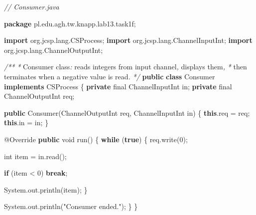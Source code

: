 \documentclass[11pt]{article}
\newenvironment{Shaded}{}{}
\newcommand{\KeywordTok}[1]{\textcolor[rgb]{0.00,0.44,0.13}{\textbf{{#1}}}}
\newcommand{\DataTypeTok}[1]{\textcolor[rgb]{0.56,0.13,0.00}{{#1}}}
\newcommand{\DecValTok}[1]{\textcolor[rgb]{0.25,0.63,0.44}{{#1}}}
\newcommand{\StringTok}[1]{\textcolor[rgb]{0.25,0.44,0.63}{{#1}}}
\newcommand{\CommentTok}[1]{\textcolor[rgb]{0.38,0.63,0.69}{\textit{{#1}}}}
\newcommand{\FunctionTok}[1]{\textcolor[rgb]{0.02,0.16,0.49}{{#1}}}
\newcommand{\NormalTok}[1]{{#1}}
\newcommand{\ImportTok}[1]{{#1}}
\newcommand{\ControlFlowTok}[1]{\textcolor[rgb]{0.00,0.44,0.13}{\textbf{{#1}}}}
\newcommand{\OperatorTok}[1]{\textcolor[rgb]{0.40,0.40,0.40}{{#1}}}
\newcommand{\BuiltInTok}[1]{{#1}}
\newcommand{\AttributeTok}[1]{\textcolor[rgb]{0.49,0.56,0.16}{{#1}}}
\begin{document}
    \begin{Shaded}
\begin{Highlighting}[]
\CommentTok{// Consumer.java}

\KeywordTok{package}\ImportTok{ pl}\OperatorTok{.}\ImportTok{edu}\OperatorTok{.}\ImportTok{agh}\OperatorTok{.}\ImportTok{tw}\OperatorTok{.}\ImportTok{knapp}\OperatorTok{.}\ImportTok{lab13}\OperatorTok{.}\ImportTok{task1f}\OperatorTok{;}

\KeywordTok{import} \ImportTok{org}\OperatorTok{.}\ImportTok{jcsp}\OperatorTok{.}\ImportTok{lang}\OperatorTok{.}\ImportTok{CSProcess}\OperatorTok{;}
\KeywordTok{import} \ImportTok{org}\OperatorTok{.}\ImportTok{jcsp}\OperatorTok{.}\ImportTok{lang}\OperatorTok{.}\ImportTok{ChannelInputInt}\OperatorTok{;}
\KeywordTok{import} \ImportTok{org}\OperatorTok{.}\ImportTok{jcsp}\OperatorTok{.}\ImportTok{lang}\OperatorTok{.}\ImportTok{ChannelOutputInt}\OperatorTok{;}

\CommentTok{/**}
 \CommentTok{*}\NormalTok{ Consumer class}\CommentTok{:}\NormalTok{ reads integers from input channel}\CommentTok{,}\NormalTok{ displays them}\CommentTok{,}
 \CommentTok{*}\NormalTok{ then terminates when a negative value is read}\CommentTok{.}
 \CommentTok{*/}
\KeywordTok{public} \KeywordTok{class}\NormalTok{ Consumer }\KeywordTok{implements}\NormalTok{ CSProcess }\OperatorTok{\{}
    \KeywordTok{private} \DataTypeTok{final}\NormalTok{ ChannelInputInt in}\OperatorTok{;}
    \KeywordTok{private} \DataTypeTok{final}\NormalTok{ ChannelOutputInt req}\OperatorTok{;}

    \KeywordTok{public} \FunctionTok{Consumer}\OperatorTok{(}\NormalTok{ChannelOutputInt req}\OperatorTok{,}\NormalTok{ ChannelInputInt in}\OperatorTok{)} \OperatorTok{\{}
        \KeywordTok{this}\OperatorTok{.}\FunctionTok{req} \OperatorTok{=}\NormalTok{ req}\OperatorTok{;}
        \KeywordTok{this}\OperatorTok{.}\FunctionTok{in} \OperatorTok{=}\NormalTok{ in}\OperatorTok{;}
    \OperatorTok{\}}

    \AttributeTok{@Override}
    \KeywordTok{public} \DataTypeTok{void} \FunctionTok{run}\OperatorTok{()} \OperatorTok{\{}
        \ControlFlowTok{while} \OperatorTok{(}\KeywordTok{true}\OperatorTok{)} \OperatorTok{\{}
\NormalTok{            req}\OperatorTok{.}\FunctionTok{write}\OperatorTok{(}\DecValTok{0}\OperatorTok{);}

            \DataTypeTok{int}\NormalTok{ item }\OperatorTok{=}\NormalTok{ in}\OperatorTok{.}\FunctionTok{read}\OperatorTok{();}

            \ControlFlowTok{if} \OperatorTok{(}\NormalTok{item }\OperatorTok{\textless{}} \DecValTok{0}\OperatorTok{)}
                \ControlFlowTok{break}\OperatorTok{;}

            \BuiltInTok{System}\OperatorTok{.}\FunctionTok{out}\OperatorTok{.}\FunctionTok{println}\OperatorTok{(}\NormalTok{item}\OperatorTok{);}
        \OperatorTok{\}}

        \BuiltInTok{System}\OperatorTok{.}\FunctionTok{out}\OperatorTok{.}\FunctionTok{println}\OperatorTok{(}\StringTok{"Consumer ended."}\OperatorTok{);}
    \OperatorTok{\}}
\OperatorTok{\}}
\end{Highlighting}
\end{Shaded}
\end{document}

